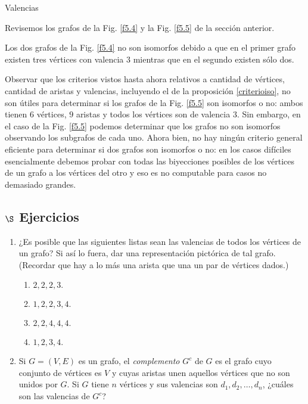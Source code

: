 \begin{section}{Valencias}
\begin{ejemplo*} Revisemos los grafos de la Fig. \ref{f5.4} y la Fig. \ref{f5.5} de la sección anterior. 

Los dos grafos de la Fig. \ref{f5.4}  no son isomorfos debido a que en el primer grafo existen tres vértices con valencia $3$ mientras que en el segundo existen sólo dos.

Observar que los criterios vistos hasta ahora relativos a cantidad de vértices,  cantidad de aristas y valencias, incluyendo el de la proposición \ref{criterioiso}, no son útiles para determinar si los grafos de  la Fig. \ref{f5.5} son isomorfos o no: ambos tienen $6$ vértices, $9$ aristas y todos los vértices son de valencia $3$. Sin embargo, en el caso de la Fig. \ref{f5.5} podemos determinar que los grafos no son isomorfos observando los subgrafos de cada uno. Ahora bien, no  hay ningún criterio general eficiente para determinar si dos grafos son isomorfos o no: en los casos difíciles esencialmente debemos probar con todas las biyecciones posibles de los vértices de un grafo a los vértices del otro y eso es no computable para casos no demasiado  grandes.   
\end{ejemplo*}

\subsection*{$\S$ Ejercicios}\label{ejercicios5.3}
\begin{enumerate}
\item ¿Es posible que las siguientes listas sean las valencias de todos los vértices de un grafo? Si así lo fuera, dar una representación pictórica de tal grafo. (Recordar que hay a lo más una arista que una un par de
vértices dados.)
\begin{multicols}{2}
    \begin{enumerate}
        \item $2,2,2,3.$
        
        \item $1,2,2,3,4.$
        
        \item $2,2,4,4,4.$
        
        \item $1,2,3,4.$
    \end{enumerate}
\end{multicols}

\item Si $G=(V,E)$ es un grafo, el \textit{complemento} $G^c$ de $G$ es el grafo cuyo conjunto de vértices es $V$ y cuyas aristas unen aquellos vértices que no son unidos por $G$. Si $G$ tiene $n$ vértices y sus valencias son $d_1,d_2,\ldots,d_n$, ¿cuáles son las valencias de $G^c$? 


\end{enumerate}
\end{section}
